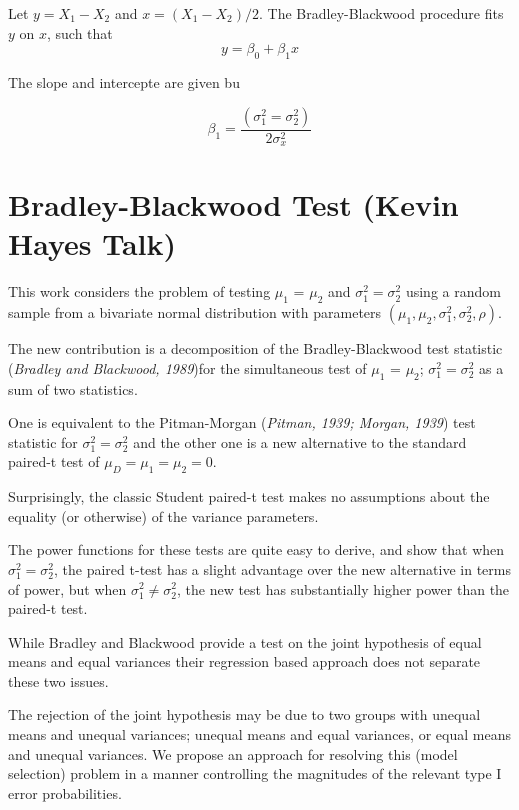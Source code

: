 \documentclass[MAIN.tex]{subfiles}
\begin{document}
Let $y = X_1 - X_2$ and $x= (X_1 - X_2)/2$.
The Bradley-Blackwood procedure fits $y$ on $x$, such that
\[ y = \beta_0 + \beta_1x \]

The slope and intercepte are given bu

\[\beta_1 =  \frac{(\sigma^2_1 = \sigma^2_2)}{2\sigma^2_x}\]


	\section{Bradley-Blackwood Test (Kevin Hayes Talk)}
	
	This work considers the problem of testing $\mu_1$ = $\mu_2$ and $\sigma^2_1 = \sigma^2_2$ using a random sample from a bivariate normal distribution with parameters $(\mu_1, \mu_2, \sigma^2_1, \sigma^2_2, \rho)$. 
	
	The new contribution is a decomposition of the Bradley-Blackwood test statistic (\textit{Bradley and Blackwood, 1989})for the simultaneous test of {$\mu_1$ = $\mu_2$; $\sigma^2_1 = \sigma^2_2$}  as a sum of two statistics. 
	
	One is equivalent to the Pitman-Morgan (\textit{Pitman, 1939; Morgan, 1939}) test statistic 
	for $\sigma^2_1 = \sigma^2_2$ and the other one is a new alternative to the standard paired-t test of $\mu_D = \mu_1 = \mu_2 = 0$. 
	
	Surprisingly, the classic Student paired-t test makes no assumptions about the equality (or otherwise) of the 
	variance parameters. 
	
	The power functions for these tests are quite easy to derive, and show that when $\sigma^2_1 = \sigma^2_2$, 
	the paired t-test has a slight advantage over the new alternative in terms of power, but when $\sigma^2_1 \neq \sigma^2_2$, the 
	new test has substantially higher power than the paired-t test.
	
	While Bradley and Blackwood provide a test on the joint hypothesis of equal means and equal variances their regression based approach does not separate these two issues.
	
	The rejection of the joint hypothesis may be 
	due to two groups with unequal means and unequal variances; unequal means and equal variances, or equal means and unequal variances. We propose an approach for resolving this (model selection) problem in a manner controlling the magnitudes of the relevant type I error probabilities.
	
\end{document}
